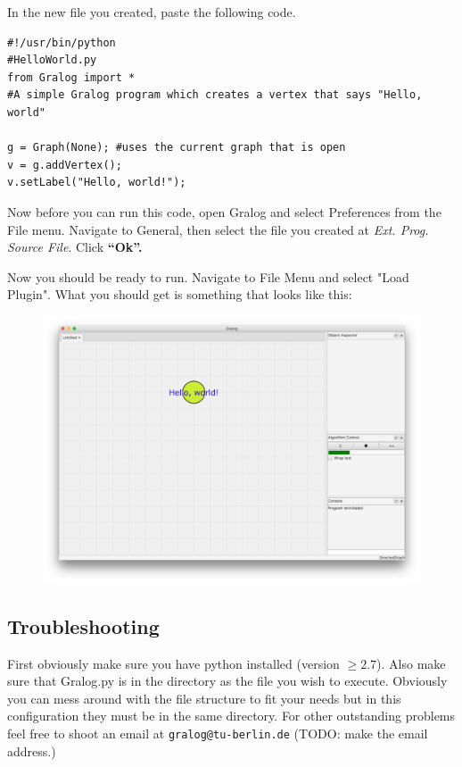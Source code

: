 \documentclass{article}
\begin{document}
In the new file you created, paste the following code.


\begin{lstlisting}[title={Code Snippet 1},label=codeSnippet1]
#!/usr/bin/python
#HelloWorld.py
from Gralog import *
#A simple Gralog program which creates a vertex that says "Hello, world"

g = Graph(None); #uses the current graph that is open
v = g.addVertex();
v.setLabel("Hello, world!");
\end{lstlisting}

Now before you can run this code, open Gralog and select Preferences from the File menu. Navigate to General, then select the file you created at \emph{Ext. Prog. Source File}. Click \textbf{``Ok''.}

Now you should be ready to run. Navigate to File Menu and select "Load Plugin". What you should get is something that looks like this: 

\begin{figure}[H]
\centering
\includegraphics[width=\textwidth]{helloWorld.png}
\end{figure}

\subsection{Troubleshooting}
First obviously make sure you have python installed (version $\ge
2.7$). Also make sure that Gralog.py is in the directory as the file you
wish to execute. Obviously you can mess around with the file structure
to fit your needs but in this configuration they must be in the same
directory. For other outstanding problems feel free to shoot an email
at \texttt{gralog@tu-berlin.de} (TODO: make the email address.)
\end{document}
